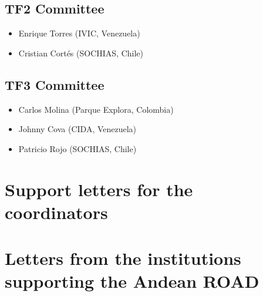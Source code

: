 \documentclass[12pt]{article}
\begin{document}
\subsection*{TF2 Committee}
\begin{itemize}
\item Enrique Torres  (IVIC, Venezuela)
\item Cristian Cort\'es (SOCHIAS, Chile)
\end{itemize}

\subsection*{TF3 Committee}
\begin{itemize}
\item Carlos Molina (Parque Explora, Colombia)
\item Johnny Cova (CIDA, Venezuela)
\item Patricio Rojo (SOCHIAS, Chile)
\end{itemize}

\newpage
\section{Support letters for the coordinators}

\newpage
\section{Letters from the institutions supporting the Andean ROAD}
\end{document}
